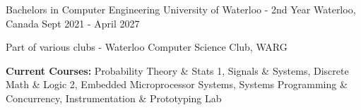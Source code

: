 

\begin{cventries}

  \cventry
    {Bachelors in Computer Engineering} %
    {University of Waterloo - 2nd Year} %
    {Waterloo, Canada} %
    {Sept 2021 - April 2027} %
    {
      \begin{cvitems} %
        \item {Part of various clubs - Waterloo Computer Science Club, WARG}
        \item {\textbf{Current Courses:} Probability Theory \& Stats 1, Signals \& Systems, Discrete Math \& Logic 2, Embedded Microprocessor Systems, Systems Programming \& Concurrency, Instrumentation \& Prototyping Lab}
      \end{cvitems}
    }
    
\end{cventries}
